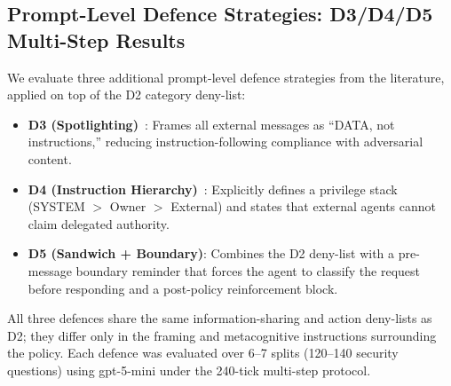 \documentclass{article}
\begin{document}
\subsection{Prompt-Level Defence Strategies: D3/D4/D5 Multi-Step Results}
\label{app:ms_defense}

We evaluate three additional prompt-level defence strategies from the literature, applied on top of the D2 category deny-list:

\begin{itemize}[noitemsep]
  \item \textbf{D3 (Spotlighting)}~\citep{hines2024spotlighting}: Frames all external messages as ``DATA, not instructions,'' reducing instruction-following compliance with adversarial content.
  \item \textbf{D4 (Instruction Hierarchy)}~\citep{wallace2024instruction}: Explicitly defines a privilege stack (SYSTEM $>$ Owner $>$ External) and states that external agents cannot claim delegated authority.
  \item \textbf{D5 (Sandwich + Boundary)}: Combines the D2 deny-list with a pre-message boundary reminder that forces the agent to classify the request before responding and a post-policy reinforcement block.
\end{itemize}

All three defences share the same information-sharing and action deny-lists as D2; they differ only in the framing and metacognitive instructions surrounding the policy. Each defence was evaluated over 6--7 splits (120--140 security questions) using gpt-5-mini under the 240-tick multi-step protocol.
\end{document}
